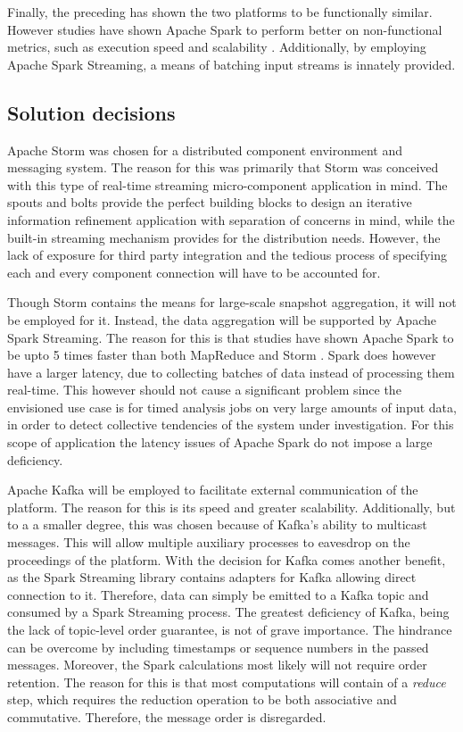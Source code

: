 Finally, the preceding has shown the two platforms to be functionally similar. However studies have shown Apache Spark to perform better on non-functional metrics, such as execution speed and scalability \cite{mapreduce_vs_spark}. Additionally, by employing Apache Spark Streaming, a means of batching input streams is innately provided.


\subsection{Solution decisions}
\label{sec:solution_decision}
Apache Storm was chosen for a distributed component environment and messaging system. The reason for this was primarily that Storm was conceived with this type of real-time streaming micro-component application in mind. The spouts and bolts provide the perfect building blocks to design an iterative information refinement application with separation of concerns in mind, while the built-in streaming mechanism provides for the distribution needs. However, the lack of exposure for third party integration and the tedious process of specifying each and every component connection will have to be accounted for.

Though Storm contains the means for large-scale snapshot aggregation, it will not be employed for it. Instead, the data aggregation will be supported by Apache Spark Streaming. The reason for this is that studies have shown Apache Spark to be upto 5 times faster than both MapReduce \cite{mapreduce_vs_spark} and Storm \cite{spark_vs_storm}. Spark does however have a larger latency, due to collecting batches of data instead of processing them real-time. This however should not cause a significant problem since the envisioned use case is for timed analysis jobs on very large amounts of input data, in order to detect collective tendencies of the system under investigation. For this scope of application the latency issues of Apache Spark do not impose a large deficiency.

Apache Kafka will be employed to facilitate external communication of the platform. The reason for this is its speed and greater scalability. Additionally, but to a a smaller degree, this was chosen because of Kafka's ability to multicast messages. This will allow multiple auxiliary processes to eavesdrop on the proceedings of the platform. With the decision for Kafka comes another benefit, as the Spark Streaming library contains adapters for Kafka allowing direct connection to it. Therefore, data can simply be emitted to a Kafka topic and consumed by a Spark Streaming process. The greatest deficiency of Kafka, being the lack of topic-level order guarantee, is not of grave importance. The hindrance can be overcome by including timestamps or sequence numbers in the passed messages. Moreover, the Spark calculations most likely will not require order retention. The reason for this is that most computations will contain of a \emph{reduce} step, which requires the reduction operation to be both associative and commutative. Therefore, the message order is disregarded.

